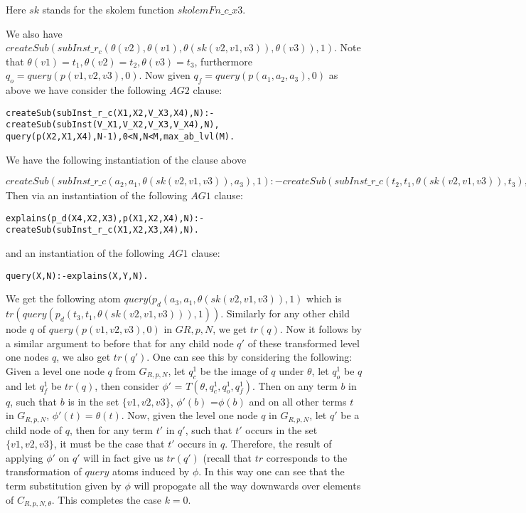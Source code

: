 \documentclass[sigconf]{acmart}
\begin{document}
Here $sk$ stands for the skolem function $skolemFn\_c\_x3$. 

We also have $createSub(subInst\_r_{c}(\theta(v2),\theta(v1),\theta(sk(v2,v1,v3)), \theta(v3)),1)$. Note that $\theta(v1)=t_{1},\theta(v2)=t_{2},\theta(v3)=t_{3}$, furthermore $q_{o}= query(p(v1,v2,v3),0)$. Now given $q_{f} = query(p(a_{1},a_{2},a_{3}),0)$ as above we have consider the following $AG2$ clause:
\begin{verbatim}
createSub(subInst_r_c(X1,X2,V_X3,X4),N):-createSub(subInst(V_X1,V_X2,V_X3,V_X4),N),
query(p(X2,X1,X4),N-1),0<N,N<M,max_ab_lvl(M).    
\end{verbatim}
We have the following instantiation of the clause above

$createSub(subInst\_r\_c(a_{2},a_{1},\theta(sk(v2,v1,v3)),a_{3}),1):-createSub(subInst\_r\_c(t_{2},t_{1},\theta(sk(v2,v1,v3)),t_{3}),1),q_{f}.$\\
Then via an instantiation of the following $AG1$ clause:
\begin{verbatim}
explains(p_d(X4,X2,X3),p(X1,X2,X4),N):-createSub(subInst_r_c(X1,X2,X3,X4),N).    
\end{verbatim}
and an instantiation of the following $AG1$ clause:
\begin{verbatim}
query(X,N):-explains(X,Y,N).    
\end{verbatim}
We get the following atom $query(p_{d}(a_{3},a_{1},\theta(sk(v2,v1,v3)),1)$ which is $tr(query(p_{d}(t_{3},t_{1},\theta(sk(v2,v1,v3))),1))$. Similarly for any other child node $q$ of $query(p(v1,v2,v3),0)$ in $G{R,p,N}$, we get $tr(q)$. Now it follows by a similar argument to before that for any child node $q'$ of these transformed level one nodes $q$, we also get $tr(q')$. One can see this by considering the following: Given a level one node $q$ from $G_{R,p,N}$, let $q_{c}^{1}$ be the image of $q$ under $\theta$, let $q_{o}^{1}$ be $q$ and let $q_{f}^{1}$ be $tr(q)$, then consider $\phi'$ = $T(\theta, q_{c}^{1},q_{o}^{1},q_{f}^{1})$. Then on any term $b$ in $q$, such that $b$ is in the set $\{v1,v2,v3\}$, $\phi'(b)$ =$\phi(b)$ and on all other terms $t$ in $G_{R,p,N}$, $\phi'(t)=\theta(t)$. Now, given the level one node $q$ in $G_{R,p,N}$, let $q'$ be a child node of $q$, then for any term $t'$ in $q'$, such that $t'$ occurs in the set $\{v1,v2,v3\}$, it must be the case that $t'$ occurs in $q$. Therefore, the result of applying $\phi'$ on $q'$ will in fact give us $tr(q')$ (recall that $tr$ corresponds to the transformation of $query$ atoms induced by $\phi$. In this way one can see that the term substitution given by $\phi$ will propogate all the way downwards over elements of $C_{R,p,N,\theta}$. This completes the case $k=0$. 
\end{document}
